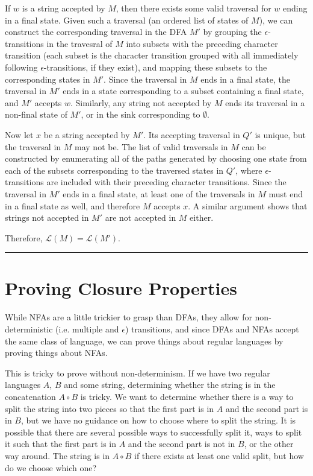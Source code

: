 \documentclass[twoside]{article}
\newenvironment{proof}{{\bf Proof:}}{\hfill\rule{2mm}{2mm}}
\begin{document}
\begin{proof}
If $w$ is a string accepted by $M$, then there exists some valid traversal for $w$ ending in a final state.  Given such a traversal (an ordered list of states of $M$), we can construct the corresponding traversal in the DFA $M'$ by grouping the $\epsilon$-transitions in the travesral of $M$ into subsets with the preceding character transition (each subset is the character transition grouped with all immediately following $\epsilon$-transitions, if they exist), and mapping these subsets to the corresponding states in $M'$.  Since the traversal in $M$ ends in a final state, the traversal in $M'$ ends in a state corresponding to a subset containing a final state, and $M'$ accepts $w$.  Similarly, any string not accepted by $M$ ends its traversal in a non-final state of $M'$, or in the sink corresponding to $\emptyset$.  

Now let $x$ be a string accepted by $M'$.  Its accepting traversal in $Q'$ is unique, but the traversal in $M$ may not be.  The list of valid traversals in $M$ can be constructed by enumerating all of the paths generated by choosing one state from each of the subsets corresponding to the traversed states in $Q'$, where $\epsilon$-transitions are included with their preceding character transitions.  Since the traversal in $M'$ ends in a final state, at least one of the traversals in $M$ must end in a final state as well, and therefore $M$ accepts $x$.  A similar argument shows that strings not accepted in $M'$ are not accepted in $M$ either.

Therefore, $\mathcal{L}(M) =\mathcal{L}(M')$.

\end{proof}

\section{Proving Closure Properties}
	While NFAs are a little trickier to grasp than DFAs, they allow for non-deterministic (i.e. multiple and $\epsilon$) transitions, and since DFAs and NFAs accept the same class of language, we can prove things about regular languages by proving things about NFAs.
	
	
	This is tricky to prove without non-determinism.  If we have two regular languages $A$, $B$ and some string, determining whether the string is in the concatenation $A\circ B$ is tricky.  We want to determine whether there is a way to split the string into two pieces so that the first part is in $A$ and the second part is in $B$, but we have no guidance on how to choose where to split the string.  It is possible that there are several possible ways to successfully split it, ways to split it such that the first part is in $A$ and the second part is not in $B$, or the other way around.  The string is in $A\circ B$ if there exists at least one valid split, but how do we choose which one?
	
\end{document}
